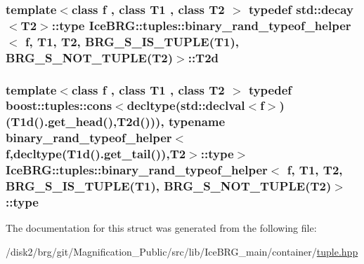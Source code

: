 \subsubsection[{T2d}]{\setlength{\rightskip}{0pt plus 5cm}template$<$class f , class T1 , class T2 $>$ typedef std\+::decay$<$T2$>$\+::{\bf type} {\bf Ice\+B\+R\+G\+::tuples\+::binary\+\_\+rand\+\_\+typeof\+\_\+helper}$<$ f, T1, T2, {\bf B\+R\+G\+\_\+\+S\+\_\+\+I\+S\+\_\+\+T\+U\+P\+L\+E}(T1), {\bf B\+R\+G\+\_\+\+S\+\_\+\+N\+O\+T\+\_\+\+T\+U\+P\+L\+E}(T2)$>$\+::{\bf T2d}}\label{structIceBRG_1_1tuples_1_1binary__rand__typeof__helper_3_01f_00_01T1_00_01T2_00_01BRG__S__IS__TU0ef4e05af1a56449fbbcc207cdc65c2c_af1be0eb66d8e56e081b0c64fb6d881f3}
\hypertarget{structIceBRG_1_1tuples_1_1binary__rand__typeof__helper_3_01f_00_01T1_00_01T2_00_01BRG__S__IS__TU0ef4e05af1a56449fbbcc207cdc65c2c_a2a9c1f9d7659014bcf48e89fffdc0996}{}
\subsubsection[{type}]{\setlength{\rightskip}{0pt plus 5cm}template$<$class f , class T1 , class T2 $>$ typedef boost\+::tuples\+::cons$<$decltype(std\+::declval$<$f$>$)({\bf T1d}().get\+\_\+head(),{\bf T2d}())), typename {\bf binary\+\_\+rand\+\_\+typeof\+\_\+helper}$<$f,decltype({\bf T1d}().get\+\_\+tail()),T2$>$\+::{\bf type}$>$ {\bf Ice\+B\+R\+G\+::tuples\+::binary\+\_\+rand\+\_\+typeof\+\_\+helper}$<$ f, T1, T2, {\bf B\+R\+G\+\_\+\+S\+\_\+\+I\+S\+\_\+\+T\+U\+P\+L\+E}(T1), {\bf B\+R\+G\+\_\+\+S\+\_\+\+N\+O\+T\+\_\+\+T\+U\+P\+L\+E}(T2)$>$\+::{\bf type}}\label{structIceBRG_1_1tuples_1_1binary__rand__typeof__helper_3_01f_00_01T1_00_01T2_00_01BRG__S__IS__TU0ef4e05af1a56449fbbcc207cdc65c2c_a2a9c1f9d7659014bcf48e89fffdc0996}


The documentation for this struct was generated from the following file\+:\begin{DoxyCompactItemize}
\item 
/disk2/brg/git/\+Magnification\+\_\+\+Public/src/lib/\+Ice\+B\+R\+G\+\_\+main/container/\hyperlink{tuple_8hpp}{tuple.\+hpp}\end{DoxyCompactItemize}
